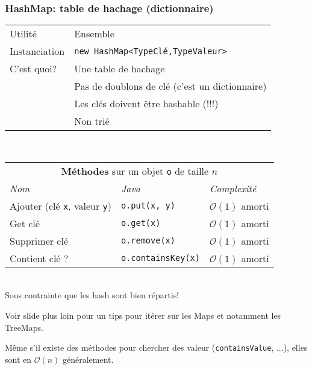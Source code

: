 \documentclass[8pt,aspectratio=169]{beamer}
\begin{document}
\begin{frame}
\frametitle{HashMap: table de hachage (dictionnaire)}
\centering
\begin{tabular}{ll}
	Utilité & Ensemble\\
	Instanciation & \texttt{new HashMap<TypeClé,TypeValeur>}\\
	C'est quoi? & Une table de hachage\\
	& \color{red} Pas de doublons de clé (c'est un dictionnaire)\\
	& \color{red} Les clés doivent être hashable (!!!)\\
	& \color{red} Non trié
	
\end{tabular}\\
\vspace{0.5cm}
\centering
\begin{tabular}{lll}
	\multicolumn{3}{c}{\textbf{Méthodes} sur un objet \texttt{o} de taille $n$} \\
	\textit{Nom} & \textit{Java} & \textit{Complexité} \\
	Ajouter (clé \texttt{x}, valeur \texttt{y})& \texttt{o.put(x, y)} & $\mathcal{O}(1)$ \color{orange} amorti\\
	Get clé & \texttt{o.get(x)} & $\mathcal{O}(1)$ \color{orange} amorti\\
	Supprimer clé & \texttt{o.remove(x)} & $\mathcal{O}(1)$ \color{orange} amorti\\
	Contient clé ? & \texttt{o.containsKey(x)} & $\mathcal{O}(1)$ \color{orange} amorti\\
\end{tabular}\\
\vspace{0.5cm}
\color{blue} Sous contrainte que les hash sont bien répartis!

\color{blue} Voir slide plus loin pour un tips pour itérer sur les Maps et notamment les TreeMaps.

\color{red} Même s'il existe des méthodes pour chercher des valeur (\texttt{containsValue}, ...), elles sont en $\mathcal{O}(n)$ généralement.
\end{frame}
\end{document}
